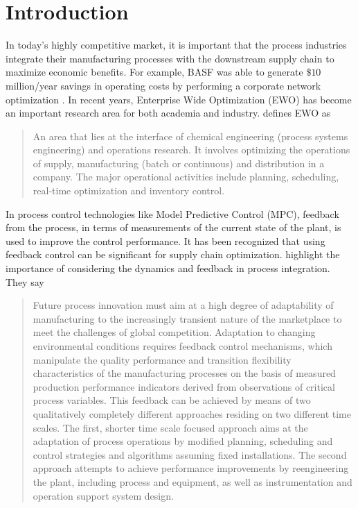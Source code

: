 \chapter{Introduction}
\label{chap:introduction}
In today's highly competitive market, it is important that
the process industries integrate their manufacturing
processes with the downstream supply chain to maximize economic
benefits. For example, BASF was able to generate $\$10$ million/year
savings in operating costs by performing a corporate network
optimization \citep{grossmann:2005}. In recent years, Enterprise Wide
Optimization (EWO) has become an important research area for both
academia and industry. \citet{grossmann:2005} defines EWO as 
\begin{quotation}
An area that lies at the interface of chemical engineering (process systems
engineering) and operations research. It involves optimizing the
operations of supply, manufacturing (batch or continuous) and
distribution in a company. The major operational activities include
planning, scheduling, real-time optimization and inventory control.
\end{quotation}

In process control technologies like Model Predictive Control (MPC),
feedback from the process, in terms of measurements of the current state
of the plant, is used to improve the control performance. It has been
recognized that using feedback control can be significant for supply
chain optimization. \citet{backx:bosgra:marquardt:2000} highlight the
importance of considering the dynamics and feedback in process
integration. They say

\begin{quotation}
Future process innovation must aim at a high degree of adaptability of
manufacturing to the increasingly transient nature of the marketplace
to meet the challenges of global competition. Adaptation to changing
environmental conditions requires feedback control mechanisms, which
manipulate the quality performance and transition flexibility
characteristics of the manufacturing processes on the basis of measured
production performance indicators derived from observations of
critical process variables. This feedback can be achieved by means of
two qualitatively completely different approaches residing on two
different time scales. The first, shorter time scale focused approach
aims at the adaptation of process operations by modified planning,
scheduling and control strategies and algorithms assuming fixed
installations. The second approach attempts to achieve performance
improvements by reengineering the plant, including process and
equipment, as well as instrumentation and operation support system design.
\end{quotation}


